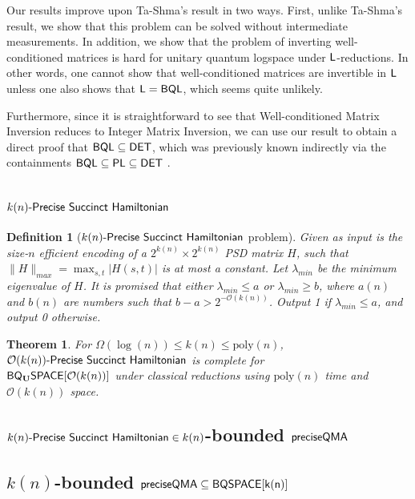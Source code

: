 \documentclass[11pt]{article}
\newcommand{\classfont}{\sf}
\newtheorem{theorem}[lemma]{Theorem}
\newtheorem{definition}[lemma]{Definition}
\numberwithin{lemma}{section}
\theoremstyle{definition}
\newcommand\BQSPACE{\sf{BQSPACE}}
\newcommand\DET{{\sf{DET}}}
\newcommand\Logspace{{\sf{L}}}
\newcommand\preciseQMA{{\sf{preciseQMA}}}
\newcommand\PLclass{{\sf{PL}}}
\newcommand{\Unitary}{\mathbf{U}}
\newcommand{\unitaryBQL}{{\classfont{BQL}}}
\newcommand{\unitaryBQSPACE}[1]{{\classfont{BQ}_\Unitary\classfont{SPACE}}[#1]}
\newcommand{\poly}{\mathrm{poly}}
\renewcommand{\le}{\leqslant}
\renewcommand{\ge}{\geqslant}
\newcommand\psham[1]{#1\textit{\sf{-Precise Succinct Hamiltonian}}}
\begin{document}
Our results improve upon Ta-Shma's result \cite{tashma} in two ways. First, unlike Ta-Shma's result, we show that this problem can be solved without intermediate measurements.  In addition, we show that the problem of inverting well-conditioned matrices is hard for unitary quantum logspace under $\Logspace$-reductions. In other words, one cannot show that well-conditioned matrices are invertible in $\Logspace$ unless one also shows that $\Logspace=\unitaryBQL$, which seems quite unlikely.

Furthermore, since it is straightforward to see that Well-conditioned Matrix Inversion reduces to Integer Matrix Inversion, we can use our result to obtain a direct proof that $\unitaryBQL\subseteq\DET$, which was previously known indirectly via the containments $\unitaryBQL\subseteq\PLclass\subseteq\DET$ \cite{Watrous03,Borodin84}.
     
    
\section{$\psham{k(n)}$}

\begin{definition}
[$\psham{k(n)}$ problem] \label{def: spechamiltonian}
Given as input is the size-$n$ efficient encoding of a $2^{k(n)} \times 2^{k(n)}$ PSD matrix $H$, such that %
 $\|H\|_{max} = \max_{s,t}|H(s,t)|$ is at most a constant. Let $\lambda_{min}$ be the minimum eigenvalue of $H$. It is promised that either $\lambda_{min} \le a$ or $\lambda_{min} \ge b$, where $a(n)$ and $b(n)$ are numbers such that $b-a > 2^{-\mathcal{O}(k(n))}$. Output 1 if $\lambda_{min} \le a$, and output 0 otherwise.
\end{definition}

\begin{theorem} \label{thm: spechamiltonian}
For $\Omega(\log(n)) \le k(n) \le \poly(n)$, $\psham{\mathcal{O}(k(n))}$ is complete for \\ $\unitaryBQSPACE{\mathcal{O}(k(n))}$ under classical reductions using $\poly(n)$ time and $\mathcal{O}(k(n))$ space.
\end{theorem}

\subsection{$\psham{k(n)}\in k(n)$-bounded $\preciseQMA$}
\subsection{$k(n)$-bounded $\preciseQMA\subseteq\BQSPACE[k(n)]$}
\end{document}

